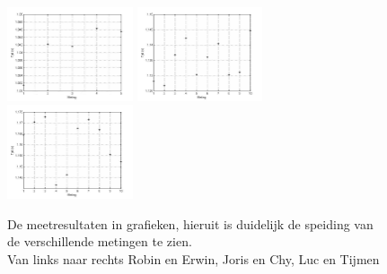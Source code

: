\documentclass{report}
\begin{document}
\begin{figure}[H]
\includegraphics[width=0.33\textwidth,page=2]{grafiekmeetresultaten1}
\includegraphics[width=0.33\textwidth,page=1]{grafiekmeetresultaten2}
\includegraphics[width=0.33\textwidth,page=3]{grafiekmeetresultaten3}
\caption{De meetresultaten in grafieken, hieruit is duidelijk de speiding van de verschillende metingen te zien. \\ \small{ Van links naar rechts Robin en Erwin, Joris en Chy, Luc en Tijmen}}
\label{fig:measureGraph}
\end{figure}
\end{document}
